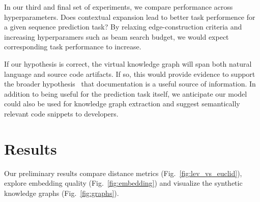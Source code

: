 \documentclass[11pt]{article}
\begin{document}
In our third and final set of experiments, we compare performance across hyperparameters. Does contextual expansion lead to better task performence for a given sequence prediction task? By relaxing edge-construction criteria and increasing hyperparamers such as beam search budget, we would expect corresponding task performance to increase.

If our hypothesis is correct, the virtual knowledge graph will span both natural language and source code artifacts. If so, this would provide evidence to support the broader hypothesis~\cite{guo2017semantically} that documentation is a useful source of information. In addition to being useful for the prediction task itself, we anticipate our model could also be used for knowledge graph extraction and suggest semantically relevant code snippets to developers.


%
%

\section{Results}\label{sec:results}

Our preliminary results compare distance metrics (Fig.~\ref{fig:lev_vs_euclid}), explore embedding quality (Fig.~\ref{fig:embedding}) and visualize the synthetic knowledge graphs (Fig.~\ref{fig:graphs}).
\end{document}
